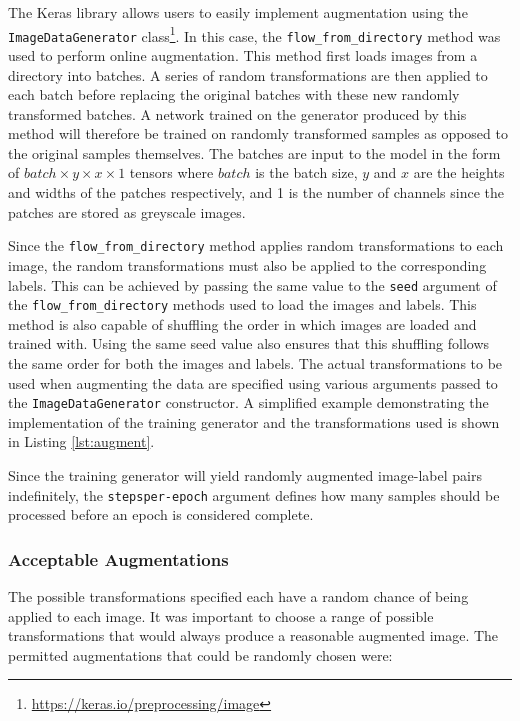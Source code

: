 The Keras library allows users to easily implement augmentation using the \texttt{ImageDataGenerator} class\footnote{\url{https://keras.io/preprocessing/image}}. In this case, the \texttt{flow\_from\_directory} method was used to perform online augmentation. This method first loads images from a directory into batches. A series of random transformations are then applied to each batch before replacing the original batches with these new randomly transformed batches. A network trained on the generator produced by this method will therefore be trained on randomly transformed samples as opposed to the original samples themselves. The batches are input to the model in the form of $batch \times y \times x \times 1$ tensors where $batch$ is the batch size, $y$ and $x$ are the heights and widths of the patches respectively, and 1 is the number of channels since the patches are stored as greyscale images.


Since the \texttt{flow\_from\_directory} method applies random transformations to each image, the random transformations must also be applied to the corresponding labels. This can be achieved by passing the same value to the \texttt{seed} argument of the \texttt{flow\_from\_directory} methods used to load the images and labels. This method is also capable of shuffling the order in which images are loaded and trained with. Using the same seed value also ensures that this shuffling follows the same order for both the images and labels. The actual transformations to be used when augmenting the data are specified using various arguments passed to the \texttt{ImageDataGenerator} constructor. A simplified example demonstrating the implementation of the training generator and the transformations used is shown in Listing \ref{lst:augment}.

Since the training generator will yield randomly augmented image-label pairs indefinitely, the \texttt{steps\-per-epoch} argument defines how many samples should be processed before an epoch is considered complete.

\subsubsection{Acceptable Augmentations}

The possible transformations specified each have a random chance of being applied to each image. It was important to choose a range of possible transformations that would always produce a reasonable augmented image. The permitted augmentations that could be randomly chosen were:

